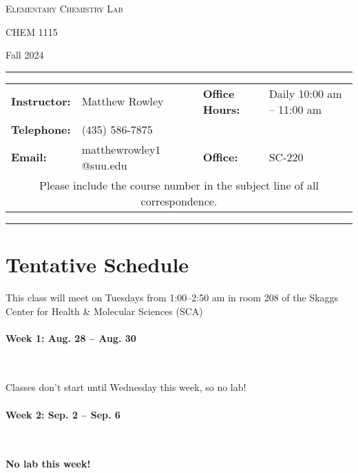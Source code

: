 \documentclass[12pt, letterpaper]{article}
\begin{document}
\begin{center}
	{\Large \textsc{Elementary Chemistry Lab}}

	CHEM 1115
\end{center}

\begin{center}
	{\large Fall 2024}
\end{center}
\begin{center}
	\rule{0.99\textwidth}{0.4pt}
	\begin{tabular}{llcll}
		\textbf{Instructor:} & Matthew Rowley           &  & \textbf{Office Hours:} & Daily 10:00 am -- 11:00 am \\
		\textbf{Telephone:}  & (435) 586-7875           &  &                        &  \\
		\textbf{Email:}      & matthewrowley$1$@suu.edu &  & \textbf{Office:}       & SC-220                   \\
		\multicolumn{5}{c}{Please include the course number in the subject line of all correspondence.}
	\end{tabular}
	\rule{0.99\textwidth}{0.4pt}
\end{center}

\section*{Tentative Schedule}
This class will meet on Tuesdays from 1:00--2:50 am in room 208 of the Skaggs Center for Health \& Molecular Sciences (SCA)

\paragraph{Week 1: Aug. 28 -- Aug. 30}~

Classes don't start until Wednesday this week, so no lab!

\paragraph{Week 2: Sep. 2 -- Sep. 6}~

\textbf{No lab this week!}
\end{document}

